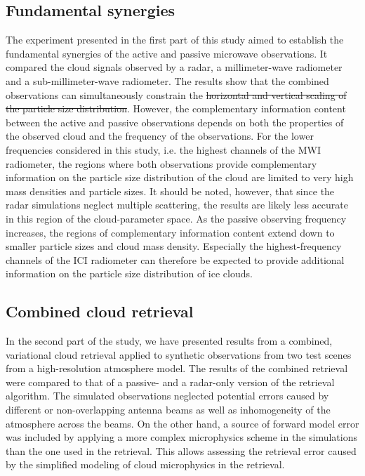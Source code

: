 \documentclass[journal abbreviation, manuscript]{copernicus}
\providecommand{\DIFadd}[1]{{\protect\color{blue}\uwave{#1}}} %
\providecommand{\DIFdel}[1]{{\protect\color{red}\sout{#1}}}                      %
\providecommand{\DIFaddbegin}{} %
\providecommand{\DIFaddend}{} %
\providecommand{\DIFdelbegin}{} %
\providecommand{\DIFdelend}{} %
\begin{document}
\DIFaddend \subsection{Fundamental synergies}

The experiment presented in the first part of this study aimed to establish the
fundamental synergies of the active and passive microwave observations. It
compared the cloud signals observed by a radar, a millimeter-wave radiometer and
a sub-millimeter-wave radiometer. The results show that the combined
observations can simultaneously constrain the \DIFdelbegin \DIFdel{horizontal and vertical scaling of
the particle size distribution}\DIFdelend \DIFaddbegin \DIFadd{size and concentration of
particles in the cloud}\DIFaddend . However, the complementary information content between
the active and passive observations depends on both the properties of the
observed cloud and the frequency of the observations. For the lower frequencies
considered in this study, i.e. the highest channels of the MWI radiometer, the
regions where both observations provide complementary information on the
particle size distribution of the cloud are limited to very high mass densities
and particle sizes. It should be noted, however, that since the radar
simulations neglect multiple scattering, the results are likely less accurate in
this region of the cloud-parameter space. As the passive observing frequency
increases, the regions of complementary information content extend down to
smaller particle sizes and cloud mass density. Especially the highest-frequency
channels of the ICI radiometer can therefore be expected to provide additional
information on the particle size distribution of ice clouds.

\subsection{Combined cloud retrieval}

In the second part of the study, we have presented results from a combined,
variational cloud retrieval applied to synthetic observations from two test
scenes from a high-resolution atmosphere model. The results of the combined
retrieval were compared to that of a passive- and a radar-only version of the
retrieval algorithm. The simulated observations neglected potential errors
caused by different or non-overlapping antenna beams as well as inhomogeneity of
the atmosphere across the beams. On the other hand, a source of forward model
error was included by applying a more complex microphysics scheme in the
simulations than the one used in the retrieval. This allows assessing the
retrieval error caused by the simplified modeling of cloud microphysics in the
retrieval.
\end{document}
